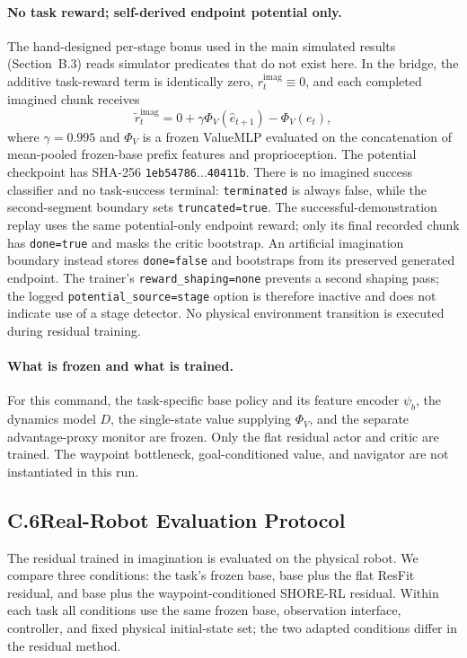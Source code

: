 \documentclass[letterpaper]{article} %
\begin{document}
\paragraph{No task reward; self-derived endpoint potential only.}
The hand-designed per-stage bonus used in the main simulated results
(Section~B.3) reads simulator predicates that do not exist here. In the bridge,
the additive task-reward term is identically zero,
$r_t^{\mathrm{imag}}\equiv0$, and each completed imagined chunk receives
\[
\tilde r_t^{\mathrm{imag}}
=0+\gamma\Phi_V(\widehat e_{t+1})-\Phi_V(e_t),
\]
where $\gamma=0.995$ and $\Phi_V$ is a frozen ValueMLP evaluated on the
concatenation of mean-pooled frozen-base prefix features and proprioception.
The potential checkpoint has SHA-256
\texttt{1eb54786$\ldots$40411b}.
There is no imagined success classifier and no task-success terminal:
\texttt{terminated} is always false, while the second-segment boundary sets
\texttt{truncated=true}. The successful-demonstration replay uses the same
potential-only endpoint reward; only its final recorded chunk has
\texttt{done=true} and masks the critic bootstrap. An artificial imagination
boundary instead stores \texttt{done=false} and bootstraps from its preserved
generated endpoint. The trainer's \texttt{reward\_shaping=none} prevents a
second shaping pass; the logged \texttt{potential\_source=stage} option is
therefore inactive and does not indicate use of a stage detector. No physical
environment transition is executed during residual training.

\paragraph{What is frozen and what is trained.}
For this command, the task-specific base policy and its feature encoder
$\psi_b$, the dynamics model $D$, the single-state value supplying $\Phi_V$,
and the separate advantage-proxy monitor are frozen. Only the flat residual
actor and critic are trained. The waypoint bottleneck, goal-conditioned value,
and navigator are not instantiated in this run.

\subsection{C.6\quad Real-Robot Evaluation Protocol}

The residual trained in imagination is evaluated on the physical robot. We
compare three conditions: the task's frozen base, base plus the flat ResFit
residual, and base plus the waypoint-conditioned SHORE-RL residual. Within each
task all conditions use the same frozen base, observation interface, controller,
and fixed physical initial-state set; the two adapted conditions differ in the
residual method.
\end{document}
